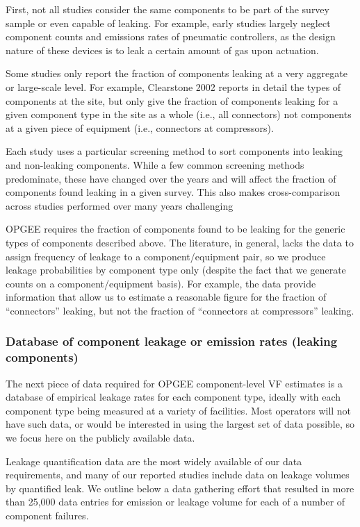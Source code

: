 \documentclass[11pt]{report}
\begin{document}
{{{{First, not all studies consider the same components to be part of the survey sample or even capable of leaking. For example, early studies largely neglect component counts and emissions rates of pneumatic controllers, as the design nature of these devices is to leak a certain amount of gas upon actuation.

Some studies only report the fraction of components leaking at a very aggregate or large-scale level. For example, Clearstone 2002 reports in detail the types of components at the site, but only give the fraction of components leaking for a given component type in the site as a whole (i.e., all connectors) not components at a given piece of equipment (i.e., connectors at compressors).

Each study uses a particular screening method to sort components into leaking and non-leaking components. While a few common screening methods predominate, these have changed over the years and will affect the fraction of components found leaking in a given survey. This also makes cross-comparison across studies performed over many years challenging

OPGEE requires the fraction of components found to be leaking for the generic types of components described above. The literature, in general, lacks the data to assign frequency of leakage to a component/equipment pair, so we produce leakage probabilities by component type only (despite the fact that we generate counts on a component/equipment basis). For example, the data provide information that allow us to estimate a reasonable figure for the fraction of ``connectors'' leaking, but not the fraction of ``connectors at compressors'' leaking.


\subsubsection{Database of component leakage or emission rates (leaking components)}

The next piece of data required for OPGEE component-level VF estimates is a database of empirical leakage rates for each component type, ideally with each component type being measured at a variety of facilities.  Most operators will not have such data, or would be interested in using the largest set of data possible, so we focus here on the publicly available data.

Leakage quantification data are the most widely available of our data requirements, and many of our reported studies include data on leakage volumes by quantified leak. We outline below a data gathering effort that resulted in more than 25,000 data entries for emission or leakage volume for each of a number of component failures.  


}}}}
\end{document}
